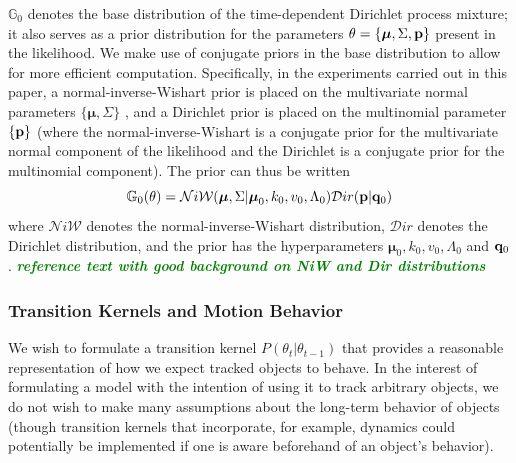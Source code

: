 \documentclass[smallcondensed, final]{svjour3}
\newcommand{\willie}[1]{\textcolor{green}{\textsf{\emph{\textbf{\textcolor{green}{#1}}}}}}
\begin{document}
$\mathbb{G}_{0}$ denotes the base distribution of the time-dependent Dirichlet process mixture; it also serves as a prior distribution for the parameters $\theta = \{ \boldsymbol{\mu}, \Sigma, \bold{p} \}$ present in the likelihood. We make use of conjugate priors in the base distribution to allow for more efficient computation. Specifically, in the experiments carried out in this paper, a normal-inverse-Wishart prior is placed on the multivariate normal parameters $\{ \boldsymbol{\mu}, \Sigma \}$ , and a Dirichlet prior is placed on the multinomial parameter $ \{  \bold{p}  \} $ (where the normal-inverse-Wishart is a conjugate prior for the multivariate normal component of the likelihood and the Dirichlet is a conjugate prior for the multinomial component). The prior can thus be written
\begin{equation} \label{basedistro}
\mathbb{G}_{0}(\theta) = \mathcal{N}i\mathcal{W}(\boldsymbol{\mu}, \Sigma | \boldsymbol{\mu}_{0}, k_{0}, v_{0}, \Lambda_{0})  \mathcal{D}ir( \bold{p} | \bold{q}_{0})
\end{equation}
where $\mathcal{N}i\mathcal{W}$ denotes the normal-inverse-Wishart distribution, $\mathcal{D}ir$ denotes the Dirichlet distribution, and the prior has the hyperparameters $\boldsymbol{\mu}_{0}, k_{0}, v_{0}, \Lambda_{0}$ and $\bold{q}_{0}$.  \willie{reference text with good background on NiW and Dir distributions}



\subsubsection{Transition Kernels and Motion Behavior}

We wish to formulate a transition kernel $P(\theta_{t} | \theta_{t-1})$ that provides a reasonable representation of how we expect tracked objects to behave. In the interest of formulating a model with the intention of using it to track arbitrary objects, we do not wish to make many assumptions about the long-term behavior of objects (though transition kernels that incorporate, for example, dynamics could potentially be implemented if one is aware beforehand of an object's behavior).
\end{document}
